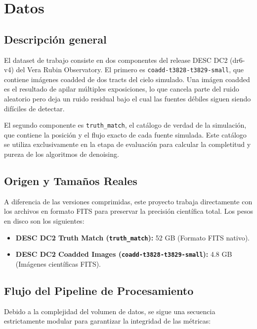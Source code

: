 \chapter{Datos}

\section{Descripci\'on general}

El dataset de trabajo consiste en dos componentes del release DESC DC2 (dr6-v4) del Vera Rubin Observatory. El primero es \texttt{coadd-t3828-t3829-small}, que contiene im\'agenes coadded de dos tracts del cielo simulado. Una im\'agen coadded es el resultado de apilar m\'ultiples exposiciones, lo que cancela parte del ruido aleatorio pero deja un ruido residual bajo el cual las fuentes d\'ebiles siguen siendo dif\'iciles de detectar.

\bigskip

El segundo componente es \texttt{truth\_match}, el cat\'alogo de verdad de la simulaci\'on, que contiene la posici\'on y el flujo exacto de cada fuente simulada. Este cat\'alogo se utiliza exclusivamente en la etapa de evaluaci\'on para calcular la completitud y pureza de los algoritmos de denoising.

\bigskip

\section{Origen y Tamaños Reales}

A diferencia de las versiones comprimidas, este proyecto trabaja directamente con los archivos en formato FITS para preservar la precisi\'on cient\'ifica total. Los pesos en disco son los siguientes:

\begin{itemize}
  \item \textbf{DESC DC2 Truth Match (\texttt{truth\_match}):} 52 GB (Formato FITS nativo).
  \item \textbf{DESC DC2 Coadded Images (\texttt{coadd-t3828-t3829-small}):} 4.8 GB (Im\'agenes científicas FITS).
\end{itemize}

\bigskip

\section{Flujo del Pipeline de Procesamiento}

Debido a la complejidad del volumen de datos, se sigue una secuencia estrictamente modular para garantizar la integridad de las m\'etricas:

